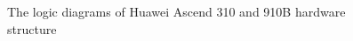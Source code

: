 \begin{figure}[tb]
    \caption{The logic diagrams of Huawei Ascend 310 and 910B hardware structure}
    \label{fig:dav}
    \end{figure}

